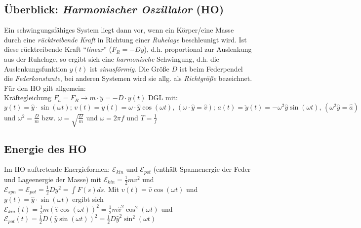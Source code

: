 \documentclass[a4paper]{scrartcl}
\begin{document}
\subsection{Überblick: \emph{Harmonischer Oszillator} (HO)}
Ein schwingungsfähiges System liegt dann vor, wenn ein Körper/eine Masse durch
eine \emph{rücktreibende Kraft} in Richtung einer \emph{Ruhelage} beschleunigt
wird. Ist diese rücktreibende Kraft "`\emph{linear}"' ($F_R=-Dy$), d.h.
proportional zur Auslenkung aus der Ruhelage, so ergibt sich eine
\emph{harmonische} Schwingung, d.h. die Auslenkungsfunktion $y(t)$ ist
\emph{sinusförmig}. Die Größe $D$ ist beim Federpendel die
\emph{Federkonstante}, bei anderen Systemen wird sie allg. als
\emph{Richtgröße} bezeichnet. Für den HO gilt allgemein:\\
Kräftegleichung $F_a=F_R \rightarrow m \cdot \ddot{y}=-D\cdot y(t)$ DGL mit:
$y(t) = \hat{y} \cdot \sin(\omega t);\, v(t) = \dot{y}(t) = \omega \cdot
\hat{y} \cos(\omega t),\, (\omega \cdot \hat{y}=\hat{v});\, a(t)=\ddot{y}(t) =
- \omega^2 \hat{y} \sin(\omega t),\, (\omega^2 \hat{y}=\hat{a})$ und
$\omega^2=\frac{D}{m}$ bzw. $\omega=\sqrt{\frac{D}{m}}$ und $\omega = 2 \pi f$
und $T = \frac{1}{f}$

\subsection{Energie des HO}
Im HO auftretende Energieformen: $\mathcal{E}_{kin}$ und $\mathcal{E}_{pot}$
(enthält Spannenergie der Feder und Lageenergie der Masse) mit
$\mathcal{E}_{kin} = \frac{1}{2}mv^2$ und $\mathcal{E}_{spn} =
\mathcal{E}_{pot} = \frac{1}{2}Dy^2 = \int F(s) ds$. Mit $v(t) = \hat{v}
\cos(\omega t)$ und $y(t) = \hat{y} \cdot \sin(\omega t)$ ergibt sich
$\mathcal{E}_{kin}(t) = \frac{1}{2} m (\hat{v} \cos(\omega t))^2 = \frac{1}{2}
m \hat{v}^2 \cos^2(\omega t)$ und $\mathcal{E}_{pot}(t) = \frac{1}{2} D
(\hat{y} \sin(\omega t))^2 = \frac{1}{2} D \hat{y}^2 \sin^2(\omega t)$
\end{document}
